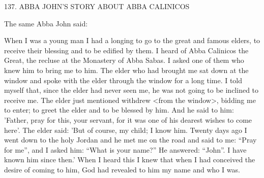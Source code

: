 137. ABBA JOHN'S STORY ABOUT ABBA CALINICOS

The same Abba John said:

When I was a young man I had a longing to go to the great and
famous elders, to receive their blessing and to be edified by them. I
heard of Abba Calinicos the Great, the recluse at the Monastery of
Abba Sabas. I asked one of them who knew him to bring me to
him. The elder who had brought me sat down at the window and
spoke with the elder through the window for a long time. I told
myself that, since the elder had never seen me, he was not going to
be inclined to receive me. The elder just mentioned withdrew <from
the window>, bidding me to enter; to greet the elder and to be
blessed by him. And he said to him: 'Father, pray for this, your
servant, for it was one of his dearest wishes to come here'. The elder
said: 'But of course, my child; I know him. Twenty days ago I went
down to the holy Jordan and he met me on the road and said to
me: “Pray for me”, and I asked him: “What is your name?” He
answered: “John”. I have known him since then.' When I heard this
I knew that when I had conceived the desire of coming to him, God
had revealed to him my name and who I was.


